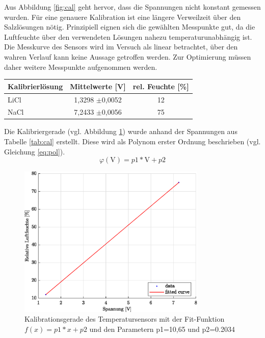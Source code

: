 Aus Abbildung \ref{fig:cal} geht hervor, dass die Spannungen nicht konstant gemessen wurden. Für eine genauere Kalibration ist eine längere Verweilzeit über den Salzlösungen nötig. Prinzipiell eignen sich die gewählten Messpunkte gut, da die Luftfeuchte über den verwendeten Lösungen nahezu temperaturunabhängig ist. Die Messkurve des Sensors wird im Versuch als linear betrachtet, über den wahren Verlauf kann keine Aussage getroffen werden. Zur Optimierung müssen daher weitere Messpunkte aufgenommen werden.
\begin{center}
	\begin{tabular}{l|c|c}
		\label{tab:cal}
		
		\textbf{Kalibrierlösung} & \textbf{Mittelwerte} [V] & rel. Feuchte [\%]\\
		\hline
		LiCl & 1,3298 $\pm$0,0052 & 12\\
		NaCl & 7,2433 $\pm$0,0056 & 75
	\end{tabular}
\end{center}

Die Kalibriergerade (vgl. Abbildung \ref{fig:cal2}) wurde anhand der Spannungen aus Tabelle \ref{tab:cal} erstellt. Diese wird als Polynom erster Ordnung beschrieben (vgl. Gleichung \ref{eq:pol}).
\begin{equation}
	\label{eq:pol}
	\varphi(\text{V}) = p1*\text{V} + p2
\end{equation}

\begin{figure}[H]
	\centering
	\includegraphics[width=0.8\textwidth]{../DATA/Kalibriergerade_Feuchte.eps}
	\caption[Kalibrationsgerade des Temperatursensors]{Kalibrationsgerade des Temperatursensors mit der Fit-Funktion $f(x) = p1*x + p2$ und den Parametern p1=10,65 und p2=0.2034}
	\label{fig:cal2}
\end{figure}

